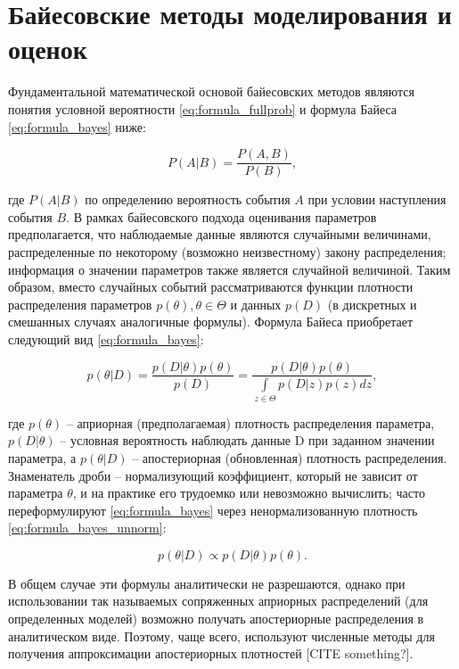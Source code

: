\documentclass[a4paper,14pt]{extreport}
\begin{document}
\section{Байесовские методы моделирования и оценок}

Фундаментальной математической основой байесовских методов являются понятия условной вероятности \ref{eq:formula_fullprob} и формула Байеса \ref{eq:formula_bayes} ниже:

\begin{equation}
	P(A|B)=\frac{P(A,B)}{P(B)} ,
	\label{eq:formula_fullprob}
\end{equation}

\noindent
где $P(A|B)$ по определению вероятность события $A$ при условии наступления события $B$. В рамках байесовского подхода оценивания параметров предполагается, что наблюдаемые данные являются случайными величинами, распределенные по некоторому (возможно неизвестному) закону распределения; информация о значении параметров также является случайной величиной. Таким образом, вместо случайных событий рассматриваются функции плотности распределения параметров $p(\theta),  \theta \in \Theta$ и данных $p(D)$ (в дискретных и смешанных случаях аналогичные формулы). Формула Байеса приобретает следующий вид \ref{eq:formula_bayes}:

\begin{equation}
	p(\theta|D) = \frac{p(D|\theta) p(\theta)}{p(D)} = \frac{p(D|\theta) p(\theta)}{\int\limits_{z\in\Theta}{p(D|z)p(z)dz}} ,
	\label{eq:formula_bayes}
\end{equation}

\noindent
где $p(\theta)$ -- априорная (предполагаемая) плотность распределения параметра, $p(D|\theta)$ -- условная вероятность наблюдать данные D при заданном значении параметра, а $p(\theta|D)$ -- апостериорная (обновленная) плотность распределения. Знаменатель дроби -- нормализующий коэффициент, который не зависит от параметра $\theta$, и на практике его трудоемко или невозможно вычислить; часто переформулируют \ref{eq:formula_bayes} через ненормализованную плотность \ref{eq:formula_bayes_unnorm}:

\begin{equation}
	p(\theta|D) \propto p(D|\theta) p(\theta) .
	\label{eq:formula_bayes_unnorm}
\end{equation}

В общем случае эти формулы аналитически не разрешаются, однако при использовании так называемых сопряженных априорных распределений (для определенных моделей) возможно получать апостериорные распределения в аналитическом виде. Поэтому, чаще всего, используют численные методы для получения аппроксимации апостериорных плотностей [CITE something?].
\end{document}
